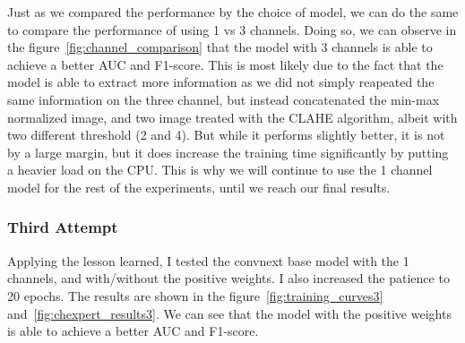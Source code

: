 \documentclass[11pt]{article}
\begin{document}
                Just as we compared the performance by the choice of model, we can do the same to compare the performance of using 1 vs 3 channels. Doing so, we can observe
                in the figure~\ref{fig:channel_comparison} that the model with 3 channels is able to achieve a better AUC and F1-score. This is most likely due to the fact that the model is able to
                extract more information as we did not simply reapeated the same information on the three channel, but instead concatenated the min-max normalized image, and two image treated
                with the CLAHE algorithm, albeit with two different threshold (2 and 4). But while it performs slightly better, it is not by a large margin, but it does increase the training time significantly
                by putting a heavier load on the CPU. This is why we will continue to use the 1 channel model for the rest of the experiments, until we reach our final results.

            \subsubsection{Third Attempt}
            Applying the lesson learned, I tested the convnext base model with the 1 channels, and with/without the positive weights. I also increased the patience to 20 epochs.
            The results are shown in the figure~\ref{fig:training_curves3} and~\ref{fig:chexpert_results3}. We can see that the model with the positive weights is able to achieve a better AUC and F1-score.
\end{document}
